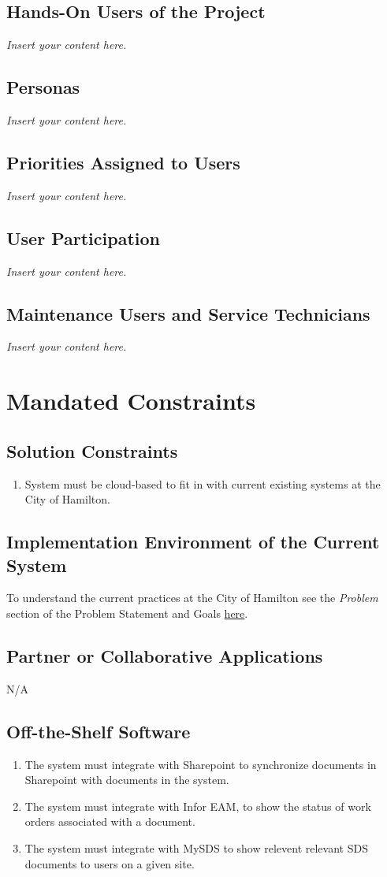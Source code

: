 \documentclass[12pt]{article}
\newcommand{\lips}{\textit{Insert your content here.}}
\begin{document}
\subsection{Hands-On Users of the Project}
\lips
\subsection{Personas}
\lips
\subsection{Priorities Assigned to Users}
\lips
\subsection{User Participation}
\lips
\subsection{Maintenance Users and Service Technicians}
\lips

\section{Mandated Constraints}
\subsection{Solution Constraints}
\begin{enumerate} [{C-SOL}1.]
  \item System must be cloud-based to fit in with current existing systems at
  the City of Hamilton.
\end{enumerate}

\subsection{Implementation Environment of the Current System}
To understand the current practices at the City of Hamilton see the
\textit{Problem} section of the Problem Statement and Goals
\href{https://github.com/Spitgranger/capstone/blob/main/docs/ProblemStatementAndGoals/ProblemStatement.md#11-problem}
{here}.

\subsection{Partner or Collaborative Applications}
N/A
\subsection{Off-the-Shelf Software}
\begin{enumerate} [{C-OTS}1.]
  \item The system must integrate with Sharepoint to synchronize documents in
  Sharepoint with documents in the system.
  \item The system must integrate with Infor EAM, to show the status of work
  orders associated with a document.
  \item The system must integrate with MySDS to show relevent relevant SDS
  documents to users on a given site.
\end{enumerate}
\end{document}
